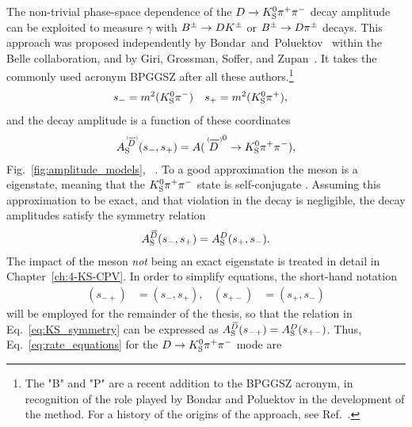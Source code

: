 The non-trivial phase-space dependence of the ${D}\rightarrow{\ensuremath{{K}^0_{\mathrm{S}}}}{\ensuremath{{\pi}^+}}{\ensuremath{{\pi}^-}}$ decay amplitude can be exploited to measure $\gamma$ with ${{B}^\pm}\rightarrow {\ensuremath{D}}{\ensuremath{{K}^\pm}}$ or ${{B}^\pm}\rightarrow {\ensuremath{D}}{\ensuremath{{\pi}^\pm}}$ decays. This approach was proposed independently by Bondar~and~Poluektov~\cite{BONDARGGSZ,BELLE2004} within the Belle collaboration, and by Giri, Grossman, Soffer, and Zupan~\cite{giriDeterminingGammaUsing2003}. It takes the commonly used acronym BPGGSZ after all these authors.\footnote{The "B" and "P" are a recent addition to the BPGGSZ acronym, in recognition of the role played by Bondar and Poluektov in the development of the method. For a history of the origins of the approach, see Ref.~\cite{ceccucciOriginsMethodDetermine2020}.} 
\begin{align}
     s_- &=m^2({{K}^0_{\mathrm{S}}}{{\pi}^-}) & s_+ &=m^2({{K}^0_{\mathrm{S}}}{{\pi}^+}),
\end{align} and the \D decay amplitude is a function of these coordinates
\begin{align}\label{eq:ADDb_definition}
\ADorDbS (\smpLong)= A(\DorDbar^0\to K^0_\text{S} \pi^+\pi^-),
\end{align}
 Fig.~\ref{fig:amplitude_models}, ~\cite{Belle2018}. To a good approximation the \KS meson is a \CP eigenstate, meaning that the ${{K}^0_{\mathrm{S}}}{{\pi}^+}{{\pi}^-}$ state is self-conjugate . Assuming this approximation to be exact, and that \CP violation in the \D decay is negligible, the \D decay amplitudes satisfy the symmetry relation
\begin{align}\label{eq:KS_symmetry}
     A_{\rm S}^{{\kern 0.18em\overline{\kern -0.18em D}}}(s_-, s_+)=A_{\rm S}^{D}(s_+, s_-).
 \end{align} 
The impact of the \KS meson \emph{not} being an exact \CP eigenstate is treated in detail in Chapter~\ref{ch:4-KS-CPV}. In order to simplify equations, the short-hand notation 
 \begin{align}
     (s_{-+})&=(s_-,s_+), &(s_{+-})&=(s_+,s_-)
 \end{align} will be employed for the remainder of the thesis, so that the relation in Eq.~\eqref{eq:KS_symmetry} can be expressed as $A_{\rm S}^{{\kern 0.18em\overline{\kern -0.18em D}}}(s_{-+})=A_{\rm S}^{D}(s_{+-})$. Thus,  Eq.~\eqref{eq:rate_equations} for the ${D}\rightarrow{\ensuremath{{K}^0_{\mathrm{S}}}}{\ensuremath{{\pi}^+}}{\ensuremath{{\pi}^-}}$ mode are
